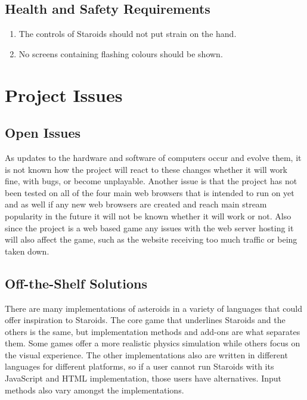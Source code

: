 \documentclass[12pt, titlepage]{article}
\begin{document}
\subsection{Health and Safety Requirements}
  \begin{enumerate}
    \item The controls of Staroids should not put strain on the hand.
    \item No screens containing flashing colours should be shown.
  \end{enumerate}


\section{Project Issues}

\subsection{Open Issues}
As updates to the hardware and software of computers occur and evolve them, it is not known how the project will react to these changes whether it will work fine, with bugs, or become unplayable. Another issue is that the project has not been tested on all of the four main web browsers that is intended to run on yet and as well if any new web browsers are created and reach main stream popularity in the future it will not be known whether it will work or not. Also since the project is a web based game any issues with the web server hosting it will also affect the game, such as the website receiving too much traffic or being taken down.\\

\subsection{Off-the-Shelf Solutions}
There are many implementations of asteroids in a variety of languages that could offer inspiration to Staroids. The core game that underlines Staroids and the others is the same, but implementation methods and add-ons are what separates them. Some games offer a more realistic physics simulation while others focus on the visual experience. The other implementations also are written in different languages for different platforms, so if a user cannot run Staroids with its JavaScript and HTML implementation, those users have alternatives. Input methods also vary amongst the implementations.\\
\end{document}
